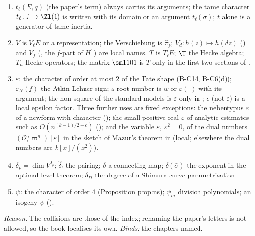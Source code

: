 \begin{convention}
\begin{enumerate}[label=(\alph*)]
characters of an extension (local, always with subscripts); $\eta_{\ur}$ is the unramified quadratic character ().
$\Delta$ is the discriminant, $\Delta(z)$ the cusp form of level one, $\Delta$ the Gram determinant of Lemma lem:ddt417 (local).
$\Lambda_E$, $\Lambda_X$ are period lattices, $\Lambda(\cdot,s)$ completed $L$-functions.
\item $t_\ell(E,q)$ (the paper's term) always carries its arguments; the tame character $t_\ell\colon I\to\Zl(1)$ is written with its
domain or an argument $t_\ell(\sigma)$; $t$ alone is a generator of tame inertia.
\item $V$ is $V_\ell E$ or a representation; the Verschiebung is $\hat\pi_p$; $V_d\colon h(z)\mapsto h(dz)$ () and $V_f$
(, the $f$-part of $H^1$) are local names. $T$ is $T_\ell E$; $\T$ the Hecke algebra; $T_n$ Hecke operators; the
matrix $\sm1101$ is $T$ only in the first two sections of .
\item $\varepsilon$: the character of order at most $2$ of the Tate shape (B-C14, B-C6(d)); $\varepsilon_N(f)$ the Atkin-Lehner sign; a root number is $w$ or $\varepsilon(\cdot)$
with its argument; the non-square of the standard models is $\varepsilon$ only in ; $\epsilon$ (not $\varepsilon$) is a
local epsilon factor. Three further uses are fixed exceptions: the nebentypus $\varepsilon$ of a newform with character ();
the small positive real $\varepsilon$ of analytic estimates such as $O(n^{(k-1)/2+\varepsilon})$ (); and the
variable $\varepsilon$, $\varepsilon^2=0$, of the dual numbers $(\mathcal O/\varpi^n)[\varepsilon]$ in the sketch of Mazur's theorem in
 (local; elsewhere the dual numbers are $k[x]/(x^2)$).
\item $\delta_p=\dim V^{I_p}$; $\hat\delta_!$ the pairing; $\delta$ a connecting map; $\delta(\bar\sigma)$ the exponent in the optimal
level theorem; $\delta_D$ the degree of a Shimura curve parametrisation.
\item $\psi$: the character of order $4$ (Proposition prop:ns); $\psi_m$ division polynomials; an isogeny $\psi$ ().
\end{enumerate}
\end{convention}

\noindent\emph{Reason.} The collisions are those of the index; renaming the paper's letters is not allowed, so the book
localises its own. \emph{Binds:} the chapters named.

